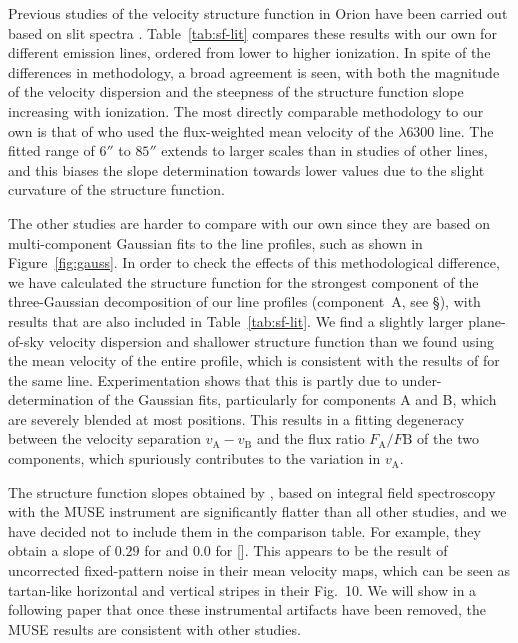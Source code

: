 \documentclass[useAMS,usenatbib]{mn2e}
\begin{document}
Previous studies of the velocity structure function in Orion have been
carried out based on slit spectra \citep{Castaneda:1988a, ODell:1992a,
  Wen:1993a}.  Table~\ref{tab:sf-lit} compares these results with our
own for different emission lines, ordered from lower to higher
ionization.  In spite of the differences in methodology, a broad
agreement is seen, with both the magnitude of the velocity dispersion
and the steepness of the structure function slope increasing with
ionization.  The most directly comparable methodology to our own is
that of \citealt{ODell:1992a} who used the flux-weighted mean velocity
of the \oi{} \(\lambda\)6300 line.  The fitted range of \(6''\) to
\(85''\) extends to larger scales than in studies of other lines,
and this biases the slope determination towards lower values due to the
slight curvature of the structure function.    

The other studies are harder to compare with our own since they are
based on multi-component Gaussian fits to the line profiles, such as
shown in Figure~\ref{fig:gauss}.  In order to check the effects of
this methodological difference, we have calculated the \oiii{}
structure function for the strongest component of the three-Gaussian
decomposition of our line profiles (component~A, see
\S\label{sec:plane-sky-versus}), with results that are also included
in Table~\ref{tab:sf-lit}.  We find a slightly larger plane-of-sky
velocity dispersion and shallower structure function than we found
using the mean velocity of the entire profile, which is consistent
with the results of \citet{Castaneda:1988a} for the same line.
Experimentation shows that this is partly due to under-determination
of the Gaussian fits, particularly for components A and B, which are
severely blended at most positions.  This results in a fitting
degeneracy between the velocity separation
\(v_\mathrm{A} - v_\mathrm{B}\) and the flux ratio
\(F_\mathrm{A}/F\mathrm{B}\) of the two components, which spuriously
contributes to the variation in \(v_\mathrm{A}\).  

The structure function slopes obtained by \citet{Mc-Leod:2015b}, based
on integral field spectroscopy with the MUSE instrument
\citep{Weilbacher:2015a} are significantly flatter than all other
studies, and we have decided not to include them in the comparison
table.  For example, they obtain a slope of \(0.29\) for \oiii{} and
\(0.0\) for [].  This appears to be the result of
uncorrected fixed-pattern noise in their mean velocity maps, which can
be seen as tartan-like horizontal and vertical stripes in their
Fig.~10.  We will show in a following paper that once these
instrumental artifacts have been removed, the MUSE results are
consistent with other studies. 




\end{document}
